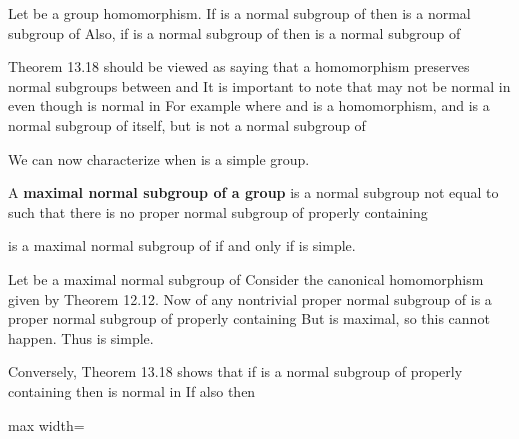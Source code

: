 \documentclass[11pt,oneside]{article}
\begin{document}
\begin{BookBody}
 Let  be a group homomorphism. If  is a normal subgroup of  then \BookInline{\phi [N]} is a normal subgroup of  Also, if  is a normal subgroup of \BookInline{\phi [G],\allowbreak } then  is a normal subgroup of \BookEnd{\blacklozenge}

Theorem 13.18 should be viewed as saying that a homomorphism  preserves normal subgroups between  and  It is important to note that \BookInline{\phi [N]} may not be normal in  even though  is normal in  For example where  and  is a homomorphism, and  is a normal subgroup of itself, but  is not a normal subgroup of 

We can now characterize when  is a simple group.

 A\textbf{ maximal normal subgroup of a group}  is a normal subgroup  not equal to  such that there is no proper normal subgroup  of  properly containing \BookEnd{\blacksquare}

  is a maximal normal subgroup of  if and only if  is simple.

 Let  be a maximal normal subgroup of  Consider the canonical homomorphism  given by Theorem 12.12. Now  of any nontrivial proper normal subgroup of  is a proper normal subgroup of  properly containing  But  is maximal, so this cannot happen. Thus  is simple.

Conversely, Theorem 13.18 shows that if  is a normal subgroup of  properly containing  then \BookInline{\gamma [N]} is normal in  If also  then

\begin{center}\begin{adjustbox}{max width=\linewidth}\end{adjustbox}\end{center}

\end{BookBody}
\end{document}
